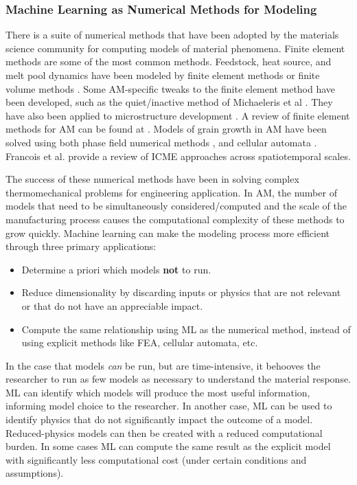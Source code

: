 \subsubsection{Machine Learning as Numerical Methods for Modeling}
There is a suite of numerical methods that have been adopted by the materials science community for computing models of material phenomena. Finite element methods are some of the most common methods. Feedstock, heat source, and melt pool dynamics have been modeled by finite element methods \cite{Toyserkani2004, Khairallah2016, Manvatkar2014} or finite  volume methods \cite{Dai2014}. Some AM-specific tweaks to the finite element method have been developed, such as the quiet/inactive method of Michaeleris et al \cite{Michaleris2014}. They have also been applied to microstructure development \cite{Nie2014}. A review of finite element methods for AM can be found at \cite{Gouge2018}. Models of grain growth in AM have been solved using both phase field numerical methods \cite{Chen2002, Gong2015, Kundin2015, Sahoo2016}, and cellular automata \cite{Tan2011}. Francois et al. provide a review of ICME approaches across spatiotemporal scales\cite{Francois2017}. 

The success of these numerical methods have been in solving complex thermomechanical problems for engineering application. In AM, the number of models that need to be simultaneously considered/computed and the scale of the manufacturing process causes the computational complexity of these methods to grow quickly. Machine learning can make the modeling process more efficient through three primary applications:
\begin{itemize}
	\item Determine a priori which models \textbf{not} to run.
	\item Reduce dimensionality by discarding inputs or physics that are not relevant or that do not have an appreciable impact. 
	\item Compute the same relationship using ML as the numerical method, instead of using explicit methods like FEA, cellular automata, etc.
\end{itemize}

In the case that models \textit{can} be run, but are time-intensive, it behooves the researcher to run as few models as necessary to understand the material response. ML can identify which models will produce the most useful information, informing model choice to the researcher. In another case, ML can be used to identify physics that do not significantly impact the outcome of a model. Reduced-physics models can then be created with a reduced computational burden. In some cases ML can compute the same result as the explicit model with significantly less computational cost (under certain conditions and assumptions).

